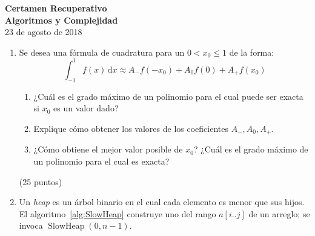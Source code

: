 \documentclass[english, spanish, fleqn]{article}
\begin{document}
\pagestyle{empty}
  \begin{center}
    {\huge\textbf{Certamen Recuperativo\\[0.25\baselineskip]
                  Algoritmos y Complejidad}}\\
    \vspace{0.5\baselineskip}
    {\large 23 de agosto de 2018}
  \end{center}
  \vspace{2mm}
  \begin{center}
  \end{center}
  \vspace{2.5mm}
  \begin{enumerate}
  \item %
    Se desea una fórmula de cuadratura
    para un \(0 < x_0 \le 1\)
    de la forma:
    \begin{equation*}
      \int_{-1}^1 f(x) \, \mathrm{d} x
	\approx A_{-} f(-x_0) + A_0 f(0) + A_{+} f(x_0)
    \end{equation*}
    \begin{enumerate}
    \item %
      ¿Cuál es el grado máximo de un polinomio para el cual puede ser exacta
      si \(x_0\) es un valor dado?
    \item %
      Explique cómo obtener los valores de los coeficientes
      \(A_{-}, A_0, A_{+}\).
    \item %
      ¿Cómo obtiene el mejor valor posible de \(x_0\)?
      ¿Cuál es el grado máximo de un polinomio para el cual es exacta?
    \end{enumerate}
    \hspace*{\fill}(25 puntos)
  \item %
    Un \emph{\foreignlanguage{english}{heap}} es un árbol binario
    en el cual cada elemento es menor que sus hijos.
    El algoritmo~\ref{alg:SlowHeap}
    construye uno del rango \(a[i..j]\) de un arreglo;
    se invoca \(\operatorname{SlowHeap}(0, n - 1)\).
    \begin{algorithm}
      \DontPrintSemicolon
\end{algorithm}
\end{enumerate}
\end{document}
